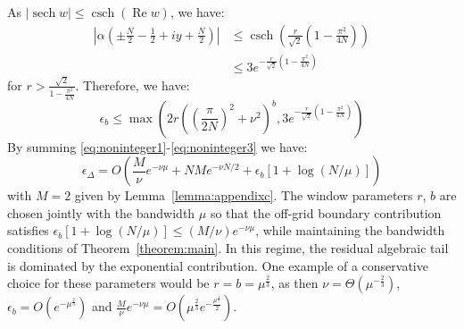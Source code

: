 \documentclass[aps,floatfix,10pt,amssymb,amsfont,amsmath,superscriptaddress,float,nofootinbib,longbibliography,nobalancelastpage,twocolumn]{revtex4-2}
\begin{document}
As $|\operatorname{sech} w| \leq \operatorname{csch}(\operatorname{Re} w)$, we have:
\begin{align}
    \left|\alpha(\pm\frac{N}{2}-\frac12+iy+\frac{N}{2})\right| &\leq \operatorname{csch}\left(\frac{r}{\sqrt{2}}\left(1-\frac{\pi^2}{4N}\right)\right)\\
    &\leq 3e^{-\frac{r}{\sqrt{2}}\left(1-\frac{\pi^2}{4N}\right)}
\end{align}
for $r > \frac{\sqrt{2}}{1-\frac{\pi^2}{4N}}$. Therefore, we have:
\begin{equation}
    \epsilon_b \leq \max\left(2r\left(
\left(\frac{\pi}{2N}\right)^2+\nu^2
\right)^{b},3e^{-\frac{r}{\sqrt{2}}\left(1-\frac{\pi^2}{4N}\right)}\right)
\end{equation}
By summing \eqref{eq:noninteger1}-\eqref{eq:noninteger3} we have:
\begin{equation}
\epsilon_\Delta=O\!\left(\frac{M}{\nu}e^{-\nu\mu}+NM e^{-\nu N/2}+\epsilon_b[1+\log(N/\mu)]\right)
\end{equation}
with $M = 2$ given by Lemma~\ref{lemma:appendixc}. The window parameters $r$, $b$ are chosen jointly with the bandwidth $\mu$ so that the off-grid boundary contribution satisfies \(\epsilon_b[1+\log(N/\mu)]\le (M/\nu)e^{-\nu\mu}\), while maintaining the bandwidth conditions of Theorem~\ref{theorem:main}. In this regime, the residual algebraic tail is dominated by the exponential contribution. One example of a conservative choice for these parameters would be $r=b=\mu^{\frac{2}{3}}$, as then $\nu = \Theta(\mu^{-\frac{2}{3}})$, $\epsilon_b = O(e^{-\mu^{\frac{2}{3}}})$ and $\frac{M}{\nu}e^{-\nu \mu} = O(\mu^{\frac{2}{3}}e^{-\frac{\mu^{\frac{1}{3}}}{2}})$.
\end{document}
